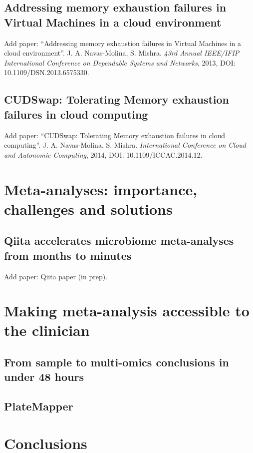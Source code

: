 \documentclass[12pt,chapterheads]{ucsd}
\begin{document}
\section{Addressing memory exhaustion failures in Virtual Machines in a cloud environment}\label{section_memory_exhaustion}
Add paper: ``Addressing memory exhaustion failures in Virtual Machines in a cloud environment''. J. A. Navas-Molina, S. Mishra. \emph{43rd Annual IEEE/IFIP International Conference on Dependable Systems and Networks}, 2013, DOI: 10.1109/DSN.2013.6575330.
\section{CUDSwap: Tolerating Memory exhaustion failures in cloud computing}\label{section_cudswap}
Add paper: ``CUDSwap: Tolerating Memory exhaustion failures in cloud computing''. J. A. Navas-Molina, S. Mishra. \emph{International Conference on Cloud and Autonomic Computing}, 2014, DOI: 10.1109/ICCAC.2014.12.

\chapter{Meta-analyses: importance, challenges and solutions}\label{chapter_qiita}
\glsresetall
\section{Qiita accelerates microbiome meta-analyses from months to minutes}\label{section_qiita}
Add paper: Qiita paper (in prep).

\chapter{Making meta-analysis accessible to the clinician}\label{chapter_rapid_response}
\glsresetall
\section{From sample to multi-omics conclusions in under 48 hours}\label{section_48hours}
\section{PlateMapper}\label{section_platemapper}

\chapter{Conclusions}\label{chapter_conclusions}
\glsresetall
% 

\appendix


\printindex %


\end{document}
